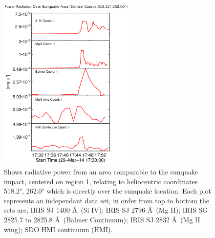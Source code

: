 \begin{figure}[H]
  \begin{center}
  \includegraphics[width=0.6\textwidth]{29-Mar-14-Ribbon-Area-1-Sunquake-Area-Power-Ladder}
  \end{center}
  \caption{Shows radiative power from an area comparable to the sunquake impact, centered on region 1, relating to heliocentric coordinates 518.2", 262.0" which is directly over the sunquake location. Each plot represents an independant data set, in order from top to bottom the sets are; IRIS SJ 1400 \AA\ (Si IV); IRIS SJ 2796 \AA\ (Mg II); IRIS SG  2825.7 to 2825.8 \AA\ (Balmer Continuum); IRIS SJ 2832 \AA\ (Mg II wing); SDO HMI continuum (HMI).}\label{plot1}
\end{figure}
